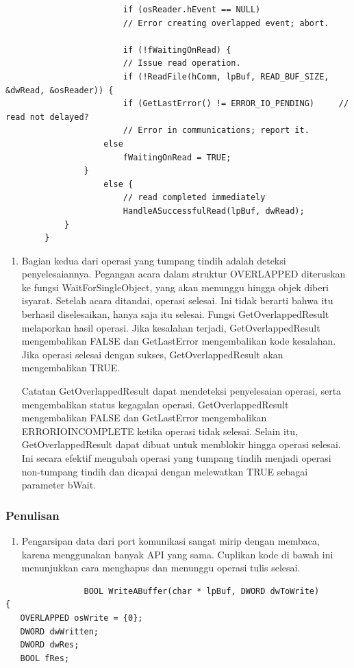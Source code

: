 \begin{enumerate}
\begin{enumerate}
\begin{verbatim}
						if (osReader.hEvent == NULL)
						// Error creating overlapped event; abort.

						if (!fWaitingOnRead) {
						// Issue read operation.
						if (!ReadFile(hComm, lpBuf, READ_BUF_SIZE, &dwRead, &osReader)) {
						if (GetLastError() != ERROR_IO_PENDING)     // read not delayed?
						// Error in communications; report it.
					else
						fWaitingOnRead = TRUE;
				}
					else {    
						// read completed immediately
						HandleASuccessfulRead(lpBuf, dwRead);
			}
		}
				\end{verbatim}

				\begin{enumerate}
						\item Bagian kedua dari operasi yang tumpang tindih adalah deteksi penyelesaiannya. Pegangan acara dalam struktur OVERLAPPED diteruskan ke fungsi WaitForSingleObject, yang akan menunggu hingga objek diberi isyarat. Setelah acara ditandai, operasi selesai. Ini tidak berarti bahwa itu berhasil diselesaikan, hanya saja itu selesai. Fungsi GetOverlappedResult melaporkan hasil operasi. Jika kesalahan terjadi, GetOverlappedResult mengembalikan FALSE dan GetLastError mengembalikan kode kesalahan. Jika operasi selesai dengan sukses, GetOverlappedResult akan mengembalikan TRUE.

						
						Catatan GetOverlappedResult dapat mendeteksi penyelesaian operasi, serta mengembalikan status kegagalan operasi. GetOverlappedResult mengembalikan FALSE dan GetLastError mengembalikan ERRORIOINCOMPLETE ketika operasi tidak selesai. Selain itu, GetOverlappedResult dapat dibuat untuk memblokir hingga operasi selesai. Ini secara efektif mengubah operasi yang tumpang tindih menjadi operasi non-tumpang tindih dan dicapai dengan melewatkan TRUE sebagai parameter bWait.
				\end{enumerate}


			
		\end{enumerate}
			\subsubsection{Penulisan}
				\begin{enumerate}
					\item Pengarsipan data dari port komunikasi sangat mirip dengan membaca, karena menggunakan banyak API yang sama. Cuplikan kode di bawah ini menunjukkan cara menghapus dan menunggu operasi tulis selesai.
				\end{enumerate}
				\begin{verbatim}
				BOOL WriteABuffer(char * lpBuf, DWORD dwToWrite)
{
   OVERLAPPED osWrite = {0};
   DWORD dwWritten;
   DWORD dwRes;
   BOOL fRes;


\end{verbatim}
\end{enumerate}
